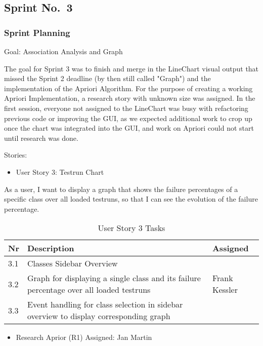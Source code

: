 \subsection{Sprint No.~3}

\subsubsection*{Sprint Planning}

Goal: Association Analysis and Graph

The goal for Sprint 3 was to finish and merge in the LineChart visual output that missed the Sprint 2 deadline (by then still called "Graph") and the implementation of the Apriori Algorithm. 
For the purpose of creating a working Apriori Implementation, a research story with unknown size was assigned. 
In the first session, everyone not assigned to the LineChart was busy with refactoring previous code or improving the GUI, as we expected additional work to crop up once the chart was integrated into the GUI, and work on Apriori could not start until research was done.

Stories: 

\begin{itemize}
	\item User Story 3: Testrun Chart
	\end{itemize}
As a user,
I want to display a graph that shows the failure percentages of a specific class over all loaded testruns, so that I can see the evolution of the failure percentage.
\begin{table}[h]
  \caption{User Story 3 Tasks}
  \label{Story ? Tasks}
  \centering
  \begin{tabular}{p{1cm}|p{5cm}|p{3cm}|}
  	Nr & Description & Assigned \\ 
  	\hline
  	3.1 & Classes Sidebar Overview &  \\ 
  	\hline
  	3.2 & Graph for displaying a single class and its failure percentage over all loaded testruns & Frank Kessler \\ 
  	\hline
  	3.3 & Event handling for class selection in sidebar overview to display corresponding graph &  \\ 
  	\hline
  \end{tabular}
\end{table}
	
\begin{itemize}	
	\item Research Aprior (R1) Assigned: Jan Martin
\end{itemize}


